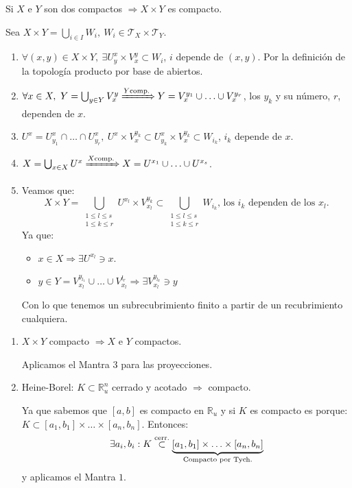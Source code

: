 \begin{theo}[de Tychonoff]
Si $X$ e $Y$ son dos compactos $\Rightarrow X \times Y$ es compacto.
\end{theo}
\begin{demo}
Sea $X \times Y = \bigcup_{i \in  I} W_i,\ W_i \in \mathcal{T}_X \times \mathcal{T}_Y$.
\begin{enumerate}
    \item $\forall \left( x, y \right) \in X \times Y,\ \exists U_y^x \times V_x^y \subset W_i$, $i$ depende de $\left( x, y \right)$. Por la definición de la topología producto por base de abiertos.
    \item $\forall x \in X,\ Y = \bigcup_{y \in Y} V_x^y \xRightarrow{Y \text{comp.}} Y = V_x^{y_1} \cup \ldots \cup V_x^{y_r}$, los $y_k$ y su número, $r$, dependen de $x$.
    \item $U^x = U_{y_1}^x \cap \ldots \cap U_{y_r}^x,\ U^x \times V_x^{y_k} \subset U_{y_k}^x \times V_x^{y_k} \subset W_{i_k}$, $i_k$ depende de $x$.
    \item $X = \bigcup_{x \in X} U^x \xRightarrow{X \text{comp.}} X = U^{x_1} \cup \ldots \cup U^{x_s}$.
    \item Veamos que:
    \[
        X \times Y = \bigcup_{\substack{1 \le l \le s\\ 1 \le k \le r}} U^{x_l} \times V_{x_l}^{y_k} \subset \bigcup_{\substack{1 \le l \le s\\ 1 \le k \le r}} W_{i_k} \text{, los } i_k \text{ dependen de los } x_l. 
    \]
    Ya que:
    \begin{itemize}
        \item $x \in X \Rightarrow \exists U^{x_l} \ni x$.
        \item $y \in Y = V_{x_l}^{y_{l_1}} \cup \ldots \cup V_{x_l}^{l_r} \Rightarrow \exists V_{x_l}^{y_{l_k}} \ni y$
    \end{itemize}
    Con lo que tenemos un subrecubrimiento finito a partir de un recubrimiento cualquiera.
\end{enumerate}
\end{demo}

\begin{obs}
\begin{enumerate}
    \item $X \times Y$ compacto $\Rightarrow X$ e $Y$ compactos.\begin{demo}
        Aplicamos el Mantra $3$ para las proyecciones.
    \end{demo} 
    \item Heine-Borel: $K \subset \mathbb{R}_u^n$ cerrado y acotado $\Rightarrow$ compacto.
    \begin{demo}
    Ya que sabemos que $\left[ a, b \right]$ es compacto en $\mathbb{R}_u$ y si $K$ es compacto es porque: $K \subset \left[ a_1, b_1 \right] \times \ldots \times \left[ a_n, b_n \right]$. Entonces: 
    \[
        \exists a_i, b_i: K \stackrel{\text{cerr.}}{\subset} \underbrace{\left[ a_1, b_1 \right] \times \ldots \times \left[ a_n, b_n \right]}_{\text{Compacto por Tych.}}  
    \]
    y aplicamos el Mantra $1$.
    \end{demo}
\end{enumerate}
\end{obs}


